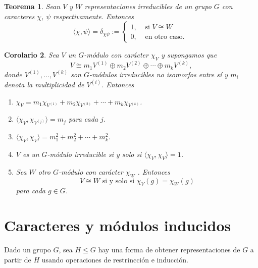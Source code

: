 \documentclass[12pt]{book}
\newtheorem{theorem}{Teorema}[section]
\newtheorem{corollary}[theorem]{Corolario}
\theoremstyle{definition}
\newcounter{in}
\begin{document}
\begin{theorem}
  Sean $V$ y $W$ representaciones irreducibles de un grupo $G$ con
  caracteres $\chi$, $\psi$ respectivamente. Entonces
  \[
  \langle\chi,\psi\rangle=\delta_{\chi\psi}:=
  \begin{cases}
    1, & \text{ si }  V\cong W \\
    0, & \text{ en otro caso. } 
  \end{cases}
  \]
\end{theorem}

\begin{corollary}
  \label{multiplicidad}
  Sea $V$ un $G$-módulo con carácter $\chi_{V}$ y supongamos que 
  \begin{equation*}
    V\cong m_{1}V^{(1)}\oplus m_{2}V^{(2)}\oplus\cdots\oplus
    m_{k}V^{(k)},
  \end{equation*}
donde $V^{(1)},\ldots,V^{(k)}$ son $G$-módulos
irreducibles no isomorfos entre sí y $m_{i}$ denota la multiplicidad
de $V^{(i)}$. Entonces
\begin{enumerate}
\item $\chi_{V}=m_{1}\chi_{V^{(1)}}+m_{2}\chi_{V^{(2)}}+\cdots+m_{k}\chi_{V^{(k)}}$.
\item $\langle\chi_{V},\chi_{V^{(j)}}\rangle=m_{j}$ para cada $j$.
\item $\langle\chi_{V},\chi_{V}\rangle=m_{1}^{2}+m_{2}^{2}+\cdots+m_{k}^{2}$.
\item $V$ es un $G$-módulo irreducible si y solo si $\langle\chi_{V},\chi_{V}\rangle=1$.
\item Sea $W$ otro $G$-módulo con carácter $\chi_{W}$ . Entonces 
  $$V\cong W \mbox{ si y solo si } \chi_{V}(g)=\chi_{W}(g)$$
  para cada $g\in G$.
\end{enumerate}
\end{corollary}

\section{Caracteres y módulos inducidos}
\label{carac-induc}

Dado un grupo $G$, sea $H\leq G$ hay una forma de obtener
representaciones de $G$ a partir de $H$ usando operaciones de
restrincción e inducción.
\end{document}
